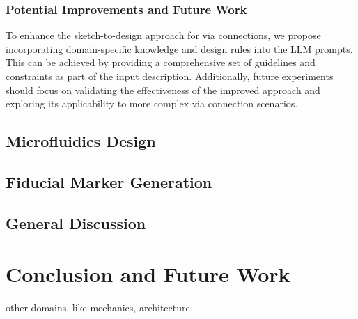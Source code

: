 \documentclass{article}
\begin{document}
\subsubsection{Potential Improvements and Future Work}
To enhance the sketch-to-design approach for via connections, we propose incorporating domain-specific knowledge and design rules into the LLM prompts. This can be achieved by providing a comprehensive set of guidelines and constraints as part of the input description. Additionally, future experiments should focus on validating the effectiveness of the improved approach and exploring its applicability to more complex via connection scenarios.

\subsection{Microfluidics Design}

\subsection{Fiducial Marker Generation}

\subsection{General Discussion}

\section{Conclusion and Future Work}
other domains, like mechanics, architecture

\printbibliography %
\end{document}
